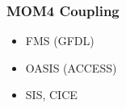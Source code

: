 \documentclass[red]{beamer}
\begin{document}
\begin{frame}
    \frametitle{MOM4 Coupling}
    
    \begin{itemize}
        \item FMS (GFDL)
        \item OASIS (ACCESS)
        \item SIS, CICE
    \end{itemize}
\end{frame}

\end{document}
